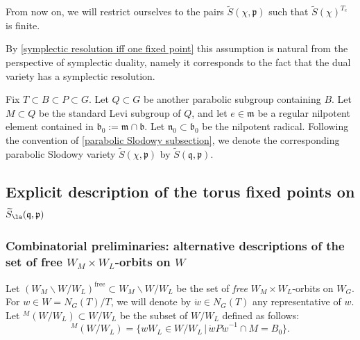 \documentclass[12pt]{amsart}
\begin{document}
From now on, we will restrict ourselves to the pairs $\widetilde{S}(\chi,\mathfrak{p})$ such that $\widetilde{S}(\chi)^{T_e}$ is finite. 



\begin{rmk}
By \cref{symplectic resolution iff one fixed point} this assumption is natural from the perspective of symplectic duality, namely it corresponds to the fact that the dual variety has a symplectic resolution.
\end{rmk}

Fix $T \subset B \subset P \subset G$. Let $Q \subset G$ be another parabolic subgroup containing $B$. Let $M \subset Q$ be the standard Levi subgroup of $Q$, and let $e \in \mathfrak{m}$ be a regular nilpotent element contained in $\mathfrak{b}_0:=\mathfrak{m} \cap \mathfrak{b}$.  Let $\mathfrak{n}_0 \subset \mathfrak{b}_0$ be the nilpotent radical. Following the convention of \cref{parabolic Slodowy subsection}, we denote the corresponding parabolic Slodowy variety $\widetilde{S}(\chi,\mathfrak{p})$ by $\widetilde{S}(\mathfrak{q},\mathfrak{p})$. 



\subsection{Explicit description of the torus fixed points on $\widetilde{S}_{\la}(\mathfrak{q},\mathfrak{p})$}\label{app_descr_fixed_points_parabolic}
\subsubsection{Combinatorial preliminaries: alternative descriptions of the set of free $W_M \times W_L$-orbits on $W$}
Let $(W_M\backslash W/W_{L})^{\mathrm{free}} \subset W_M\backslash W/W_{L}$ be the set of {\em{free}} $W_M \times W_L$-orbits on $W_G$. For $w \in W = N_G(T)/T$, we will denote by $\dot{w} \in N_G(T)$ any representative of $w$. Let ${}^M(W/W_{L}) \subset W/W_L$ be the subset of $W/W_L$ defined as follows: 
\begin{equation*}
{}^M(W/W_{L}) = \{wW_L \in W/W_L\,|\, \dot{w}P\dot{w}^{-1} \cap M = B_0\}.
\end{equation*}
\end{document}
